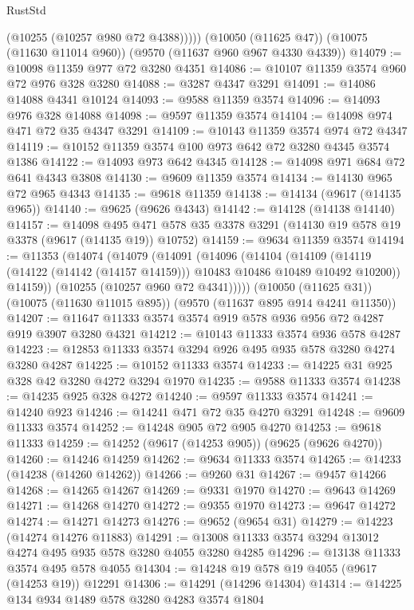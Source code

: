 \begin{lexlean}{RustStd}
\begin{coremodule}
          (@10255 (@10257 @980 @72 @4388)))))
    (@10050 (@11625 @47))
    (@10075 (@11630 @11014 @960))
    (@9570 (@11637 @960 @967 @4330 @4339))
@14079 := @10098 @11359 @977 @72 @3280 @4351
@14086 := @10107 @11359 @3574 @960 @72 @976 @328 @3280
@14088 := @3287 @4347 @3291
@14091 := @14086 @14088 @4341 @10124
@14093 := @9588 @11359 @3574
@14096 := @14093 @976 @328 @14088
@14098 := @9597 @11359 @3574
@14104 := @14098 @974 @471 @72 @35 @4347 @3291
@14109 := @10143 @11359 @3574 @974 @72 @4347
@14119 := @10152 @11359 @3574 @100 @973 @642 @72 @3280 @4345 @3574 @1386
@14122 := @14093 @973 @642 @4345
@14128 := @14098 @971 @684 @72 @641 @4343 @3808
@14130 := @9609 @11359 @3574
@14134 := @14130 @965 @72 @965 @4343
@14135 := @9618 @11359
@14138 := @14134 (@9617 (@14135 @965))
@14140 := @9625 (@9626 @4343)
@14142 := @14128 (@14138 @14140)
@14157 := @14098
    @495
    @471
    @578
    @35
    @3378
    @3291
    (@14130 @19 @578 @19 @3378 (@9617 (@14135 @19)) @10752)
@14159 := @9634 @11359 @3574
@14194 := @11353
    (@14074
      (@14079
        (@14091
          (@14096
            (@14104
              (@14109 (@14119 (@14122 (@14142 (@14157 @14159))) @10483 @10486 @10489 @10492 @10200))
              @14159))
          (@10255 (@10257 @960 @72 @4341)))))
    (@10050 (@11625 @31))
    (@10075 (@11630 @11015 @895))
    (@9570 (@11637 @895 @914 @4241 @11350))
@14207 := @11647 @11333 @3574 @3574 @919 @578 @936 @956 @72 @4287 @919 @3907 @3280 @4321
@14212 := @10143 @11333 @3574 @936 @578 @4287
@14223 := @12853 @11333 @3574 @3294 @926 @495 @935 @578 @3280 @4274 @3280 @4287
@14225 := @10152 @11333 @3574
@14233 := @14225 @31 @925 @328 @42 @3280 @4272 @3294 @1970
@14235 := @9588 @11333 @3574
@14238 := @14235 @925 @328 @4272
@14240 := @9597 @11333 @3574
@14241 := @14240 @923
@14246 := @14241 @471 @72 @35 @4270 @3291
@14248 := @9609 @11333 @3574
@14252 := @14248 @905 @72 @905 @4270
@14253 := @9618 @11333
@14259 := @14252 (@9617 (@14253 @905)) (@9625 (@9626 @4270))
@14260 := @14246 @14259
@14262 := @9634 @11333 @3574
@14265 := @14233 (@14238 (@14260 @14262))
@14266 := @9260 @31
@14267 := @9457 @14266
@14268 := @14265 @14267
@14269 := @9331 @1970
@14270 := @9643 @14269
@14271 := @14268 @14270
@14272 := @9355 @1970
@14273 := @9647 @14272
@14274 := @14271 @14273
@14276 := @9652 (@9654 @31)
@14279 := @14223 (@14274 @14276 @11883)
@14291 := @13008 @11333 @3574 @3294 @13012 @4274 @495 @935 @578 @3280 @4055 @3280 @4285
@14296 := @13138 @11333 @3574 @495 @578 @4055
@14304 := @14248 @19 @578 @19 @4055 (@9617 (@14253 @19)) @12291
@14306 := @14291 (@14296 @14304)
@14314 := @14225 @134 @934 @1489 @578 @3280 @4283 @3574 @1804

\end{coremodule}
\end{lexlean}

